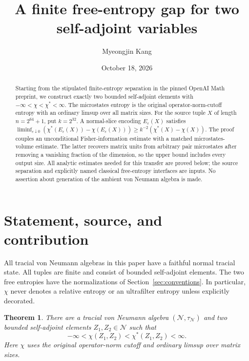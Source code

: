 \documentclass[11pt]{article}
\title{A finite free-entropy gap for two self-adjoint variables}
\author{Myeongjin Kang}
\date{October 18, 2026}
\newtheorem{theorem}{Theorem}[section]
\theoremstyle{definition}\newtheorem{definition}[theorem]{Definition}
\theoremstyle{remark}\newtheorem{remark}[theorem]{Remark}
\newcommand{\eps}{\varepsilon}\newcommand{\id}{\mathrm{id}}
\begin{document}
\maketitle
\begin{abstract}
Starting from the stipulated finite-entropy separation in the pinned OpenAI
Math preprint, we construct exactly two bounded self-adjoint elements with
$-\infty<\chi<\chi^*<\infty$. The microstates entropy is the original
operator-norm-cutoff entropy with an ordinary limsup over all matrix sizes.
For the source tuple $X$ of length $n=2^{64}+1$, put $k=2^{32}$.
A normal-slice encoding $E_\eps(X)$ satisfies
$\liminf_{\eps\downarrow0}(\chi^*(E_\eps(X))-\chi(E_\eps(X)))
\geq k^{-2}(\chi^*(X)-\chi(X))$.
The proof couples an unconditional Fisher-information estimate with a
matched microstates-volume estimate. The latter recovers matrix units
from arbitrary pair microstates after removing a vanishing fraction of
the dimension, so the upper bound includes every output size.
All analytic estimates needed for this transfer are proved below;
the source separation and explicitly named classical free-entropy
interfaces are inputs. No assertion about generation of the ambient
von Neumann algebra is made.
\end{abstract}

\section{Statement, source, and contribution}
\label{sec:intro}
All tracial von Neumann algebras in this paper have a faithful normal
tracial state. All tuples are finite and consist of bounded self-adjoint
elements. The two free entropies have the normalizations of
Section~\ref{sec:conventions}. In particular, $\chi$ never denotes a
relative entropy or an ultrafilter entropy unless explicitly decorated.

\begin{theorem}\label{thm:main}
There are a tracial von Neumann algebra $(\mathcal N,\tau_{\mathcal N})$
and two bounded self-adjoint elements $Z_1,Z_2\in\mathcal N$ such that
\[
 -\infty<\chi(Z_1,Z_2)<\chi^*(Z_1,Z_2)<\infty.
\]
Here $\chi$ uses the original operator-norm cutoff and ordinary limsup
over matrix sizes.
\end{theorem}
\end{document}
